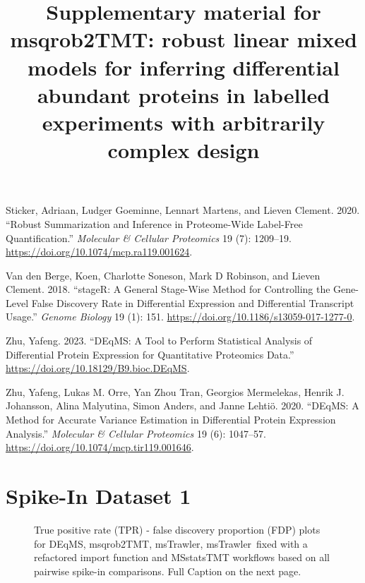 \documentclass[
  letterpaper,
  DIV=11,
  numbers=noendperiod]{scrartcl}
\newlength{\cslhangindent}
\newenvironment{CSLReferences}[2] %
 {\begin{list}{}{%
  \setlength{\itemindent}{0pt}
  \setlength{\leftmargin}{0pt}
  \setlength{\parsep}{0pt}
  \ifodd #1
   \setlength{\leftmargin}{\cslhangindent}
   \setlength{\itemindent}{-1\cslhangindent}
  \fi
  \setlength{\itemsep}{#2\baselineskip}}}
 {\end{list}}
\renewcommand*\figurename{Figure}
\newcommand\figurename{Figure}
\renewcommand*\tablename{Table}
\newcommand\tablename{Table}
\begin{document}
\begin{CSLReferences}{1}{0}
Sticker, Adriaan, Ludger Goeminne, Lennart Martens, and Lieven Clement.
2020. {``Robust Summarization and Inference in Proteome-Wide Label-Free
Quantification.''} \emph{Molecular \& Cellular Proteomics} 19 (7):
1209--19. \url{https://doi.org/10.1074/mcp.ra119.001624}.

Van den Berge, Koen, Charlotte Soneson, Mark D Robinson, and Lieven
Clement. 2018. {``stageR: A General Stage-Wise Method for Controlling
the Gene-Level False Discovery Rate in Differential Expression and
Differential Transcript Usage.''} \emph{Genome Biology} 19 (1): 151.
\url{https://doi.org/10.1186/s13059-017-1277-0}.

Zhu, Yafeng. 2023. {``DEqMS: A Tool to Perform Statistical Analysis of
Differential Protein Expression for Quantitative Proteomics Data.''}
\url{https://doi.org/10.18129/B9.bioc.DEqMS}.

Zhu, Yafeng, Lukas M. Orre, Yan Zhou Tran, Georgios Mermelekas, Henrik
J. Johansson, Alina Malyutina, Simon Anders, and Janne Lehtiö. 2020.
{``{DEqMS}: A Method for Accurate Variance Estimation in Differential
Protein Expression Analysis.''} \emph{Molecular \& Cellular Proteomics}
19 (6): 1047--57. \url{https://doi.org/10.1074/mcp.tir119.001646}.

\end{CSLReferences}

\clearpage
\setcounter{page}{1}

\title{Supplementary material for msqrob2TMT: robust linear mixed models for inferring differential abundant proteins in labelled experiments with arbitrarily complex design
}

\maketitle

\setcounter{figure}{0}
\setcounter{table}{0}
\renewcommand{\figurename}{Supplementary Figure}
\renewcommand{\tablename}{Supplementary Table}

\section*{Spike-In Dataset 1}

\begin{figure}[H]


\caption{\label{fig-WorkflowComparisonsFull}True positive rate (TPR) -
false discovery proportion (FDP) plots for DEqMS, msqrob2TMT, msTrawler,
msTrawler~fixed with a refactored import function and MSstatsTMT
workflows based on all pairwise spike-in comparisons. Full Caption on
the next page.}

\end{figure}%
\end{document}
